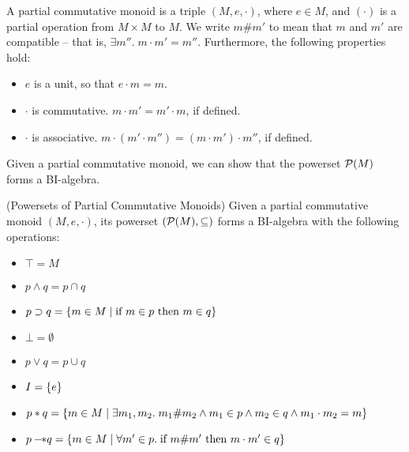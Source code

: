 A partial commutative monoid is a triple $(M, e, \cdot)$, where 
$e \in M$, and $(\cdot)$ is a partial operation from $M \times M$ to 
$M$. We write $m \# m'$ to mean that $m$ and $m'$ are compatible -- 
that is, $\exists m''.\; m \cdot m' = m''$. Furthermore, the following
properties hold: 

\begin{itemize}
\item $e$ is a unit, so that $e \cdot m = m$. 
\item $\cdot$ is commutative. $m \cdot m' = m' \cdot m$, if defined.
\item $\cdot$ is associative. $m \cdot (m' \cdot m'') = (m \cdot m') \cdot m''$, if defined.
\end{itemize}

Given a partial commutative monoid, we can show that the powerset $\mathcal{P}(M)$ 
forms a BI-algebra. 

\begin{lemma}{(Powersets of Partial Commutative Monoids)}
Given a partial commutative monoid $(M, e, \cdot)$, its powerset
$(\mathcal{P}(M), \subseteq)$ forms a BI-algebra
with the following operations:

\begin{itemize}
\item $\top = M$
\item $p \land q = p \cap q$
\item $p \supset q = \{{m \in M \;|\;\mbox{if }m \in p \mbox{ then } m \in q}\}$
\item $\bot = \emptyset$ 
\item $p \vee q = p \cup q$
\item $I = \{{e}\}$
\item $p * q = \{{m \in M\;|\; \exists m_1, m_2.\; 
                       m_1 \# m_2 \land m_1 \in p \land m_2 \in q \land m_1\cdot m_2 = m}\}$
\item $p -\!\!* q = \{ m \in M \;|\; \forall m' \in p.\; \mbox{if } m \# m' \mbox{ then } m \cdot m' \in q \}$
\end{itemize}
\end{lemma}



